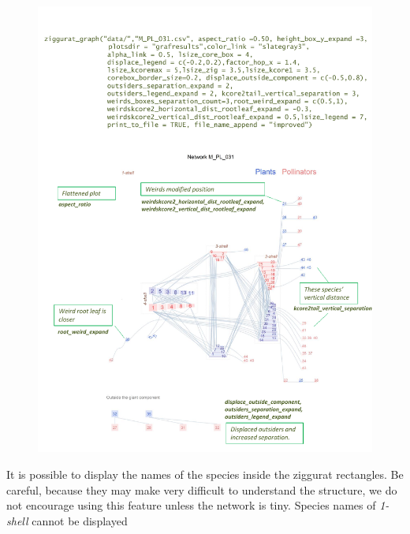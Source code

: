 \documentclass[12pt]{article}
\begin{document}
\clearpage
\begin{figure}[hp!]
\centering
\includegraphics[scale=0.8]{M_PL_031_ziggurat_improved.pdf}
\label{fig:KMAN_ziggurat_031}
\end{figure}


\clearpage

It is possible to display the names of the species inside the ziggurat rectangles. Be careful, because they may make
very difficult to understand the structure, we do not encourage using this feature unless the network is tiny. Species
names of \textit{1-shell} cannot be displayed
\end{document}
